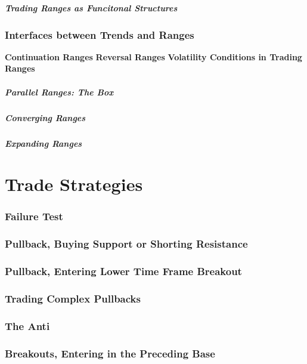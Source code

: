\documentclass{../notes}
\begin{document}
\subsubsection{Trading Ranges as Funcitonal Structures}

\section{Interfaces between Trends and Ranges}
\textbf{Continuation Ranges}
\textbf{Reversal Ranges}
\textbf{Volatility Conditions in Trading Ranges}
\subsubsection{Parallel Ranges: The Box}
\subsubsection{Converging Ranges}
\subsubsection{Expanding Ranges}



\part{Trade Strategies}
\section{Failure Test}
\section{Pullback, Buying Support or Shorting Resistance}
\section{Pullback, Entering Lower Time Frame Breakout}
\section{Trading Complex Pullbacks}
\section{The Anti}
\section{Breakouts, Entering in the Preceding Base}
\end{document}
